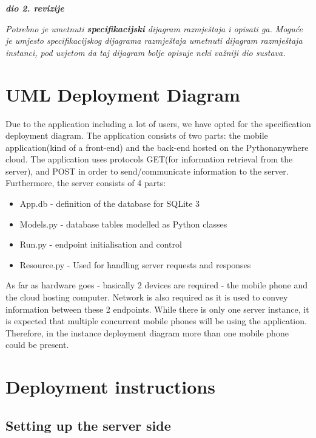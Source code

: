 			\textbf{\textit{dio 2. revizije}}
			
			 \textit{Potrebno je umetnuti \textbf{specifikacijski} dijagram razmještaja i opisati ga. Moguće je umjesto specifikacijskog dijagrama razmještaja umetnuti dijagram razmještaja instanci, pod uvjetom da taj dijagram bolje opisuje neki važniji dio sustava.}
			
			\eject 
			
		\section{UML Deployment Diagram}
		
			Due to the application including a lot of users, we have opted for the specification deployment diagram.
			The application consists of two parts: the mobile application(kind of a front-end) and the back-end hosted on the Pythonanywhere cloud. The application uses protocols GET(for information retrieval from the server), and POST in order to send/communicate information to the server. Furthermore, the server consists of 4 parts:
			\begin{itemize}
				\item App.db - definition of the database for SQLite 3
				\item Models.py - database tables modelled as Python classes
				\item Run.py - endpoint initialisation and control
				\item Resource.py - Used for handling server requests and responses
			\end{itemize}
			
			As far as hardware goes - basically 2 devices are required - the mobile phone and the cloud hosting computer. Network is also required as it is used to convey
			information between these 2 endpoints. While there is only one server instance, it is expected that multiple concurrent mobile phones will be using the application. Therefore, in the instance deployment diagram more than one mobile phone could be present.
		
			\eject
		
		\section{Deployment instructions}
		
			\subsection{Setting up the server side}
				
